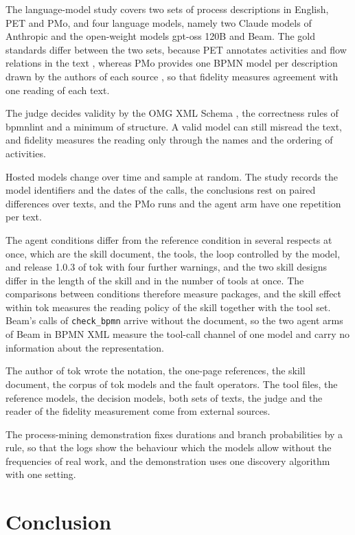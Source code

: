 \documentclass[11pt,a4paper]{article}
\begin{document}
The language-model study covers two sets of process descriptions in English, PET and PMo, and four language models, namely two Claude models of Anthropic and the open-weight models gpt-oss 120B and Beam. The gold standards differ between the two sets, because PET annotates activities and flow relations in the text \citep{Bellan2023PET}, whereas PMo provides one BPMN model per description drawn by the authors of each source \citep{Brissard2025PMo}, so that fidelity measures agreement with one reading of each text.

The judge decides validity by the OMG XML Schema \citep{OMG2014BPMN}, the correctness rules of bpmnlint \citep{bpmnlint} and a minimum of structure. A valid model can still misread the text, and fidelity measures the reading only through the names and the ordering of activities.

Hosted models change over time \citep{Chen2024chatgpt} and sample at random. The study records the model identifiers and the dates of the calls, the conclusions rest on paired differences over texts, and the PMo runs and the agent arm have one repetition per text.

The agent conditions differ from the reference condition in several respects at once, which are the skill document, the tools, the loop controlled by the model, and release 1.0.3 of tok with four further warnings, and the two skill designs differ in the length of the skill and in the number of tools at once. The comparisons between conditions therefore measure packages, and the skill effect within tok measures the reading policy of the skill together with the tool set. Beam's calls of \texttt{check\_bpmn} arrive without the document, so the two agent arms of Beam in BPMN XML measure the tool-call channel of one model and carry no information about the representation.

The author of tok wrote the notation, the one-page references, the skill document, the corpus of tok models and the fault operators. The tool files, the reference models, the decision models, both sets of texts, the judge and the reader of the fidelity measurement come from external sources.

The process-mining demonstration fixes durations and branch probabilities by a rule, so that the logs show the behaviour which the models allow without the frequencies of real work, and the demonstration uses one discovery algorithm with one setting.

\section{Conclusion}\label{sec:conclusion}
\end{document}
